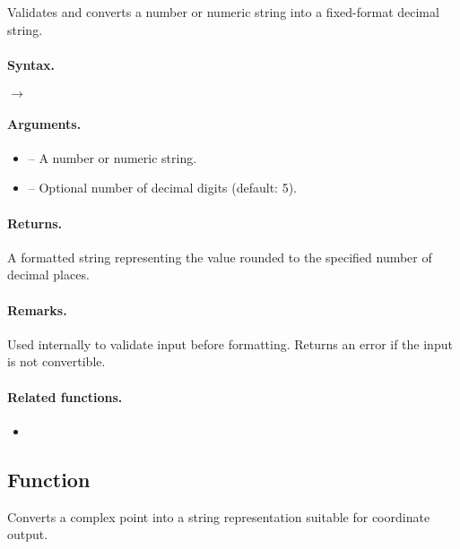 Validates and converts a number or numeric string into a fixed-format decimal string.

\paragraph{Syntax.}
\begin{center}
 \hfill $\rightarrow$ 
\end{center}

\paragraph{Arguments.}
\begin{itemize}
\item {} – A number or numeric string.
\item {} – Optional number of decimal digits (default: 5).
\end{itemize}

\paragraph{Returns.}
A formatted string representing the value rounded to the specified number of decimal places.

\paragraph{Remarks.}
Used internally to validate input before formatting. Returns an error if the input is not convertible.

\paragraph{Related functions.}
\begin{itemize}
\item {}
\end{itemize}



\subsection{Function } %
\label{sub:function_utils_format_point}

Converts a complex point into a string representation suitable for coordinate output.

